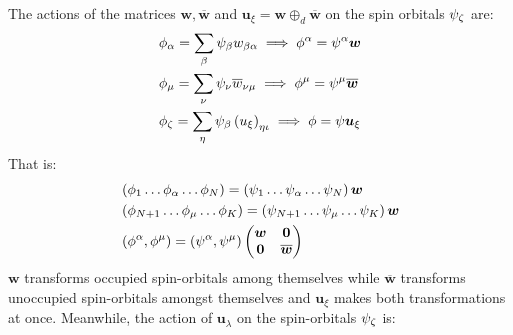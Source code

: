 \documentclass{aux/ttuthes2007}
\newcommand{\paren}[1]{\left( #1 \right)}
\newcommand{\elec}{N}
\newcommand{\orb}{K}
\newcommand{\uo}[1]{
		\IfEqCase{#1}{
			{0}{\mu}
			{1}{\nu}
			{2}{\xi}
		}[\PackageError{uo}{Undefined option to uo: #1}{}]
}
\newcommand{\oo}[1]{
		\IfEqCase{#1}{
			{0}{\alpha}
			{1}{\beta}
			{2}{\gamma}
		}[\PackageError{unocorb}{Undefined option to unuo: #1}{}]
}
\newcommand{\go}[1]{
		\IfEqCase{#1}{
			{0}{\zeta}
			{1}{\eta}
			{2}{\iota}
			{3}{\kappa}
		}[\PackageError{unocorb}{Undefined option to go: #1}{}]
}
\newcommand{\psiu}[1]{
	\psi_{\uo{#1}}
}
\newcommand{\psio}[1]{
	\psi_{\oo{#1}}
}
\newcommand{\psig}[1]{
	\psi_{\go{#1}}
}
\begin{document}
The actions of the matrices $\bm w, \overline{\bm w}$ and $\bm u_\xi = \bm w \oplus_d \overline{\bm w}$ on the spin orbitals $\psig 0$ are:
\begin{equation*}
\begin{split}
	&\phi_{\oo 0} = 
	\sum_{\oo 1}\psio 1 w_{\oo 1 \oo 0} \implies \phi^{\oo 0} = \psi^{\oo 0} \bm w \\
	&\phi_{\uo 0} = 
	\sum_{\uo 1}\psiu 1 \overline w_{\uo 1 \uo 0} \implies \phi^{\uo 0} = \psi^{\uo 0} \overline{\bm w} \\
	&\phi_{\go 0} = 
	\sum_{\go 1}\psio 1 \paren{u_\xi}_{\go 1 \go 2} \implies \phi = \psi \bm u_{\xi} 
\end{split}
\end{equation*}
That is:
\begin{equation*}
\begin{split}
	&\paren{\phi_1 \ldots \phi_{\oo 0} \ldots \phi_\elec}
	= \paren{\psi_1 \ldots \psi_{\oo 0} \ldots \psi_\elec} \bm w\\
	&\paren{\phi_{N + 1} \ldots \phi_{\uo 0} \ldots \phi_\orb}
	= \paren{\psi_{N +1} \ldots \psi_{\uo 0} \ldots \psi_\orb} \bm w\\
	&\paren{\phi^{\oo 0}, \phi^{\uo 0}}
	= \paren{\psi^{\oo 0}, \psi^{\uo 0}}
	\begin{pmatrix}\bm w & \bm 0 \\ \bm 0 & \overline {\bm w} \end{pmatrix} 
\end{split}
\end{equation*}
$\bm w$ transforms occupied spin-orbitals among themselves while $\overline{\bm w}$ transforms unoccupied spin-orbitals amongst themselves and $\bm u_\xi$ makes both transformations at once.
Meanwhile, the action of $\bm u_\lambda$ on the spin-orbitals $\psi_{\go 0}$ is:
\end{document}
